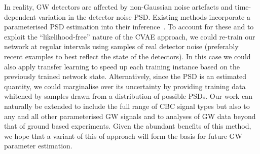 %
%
In reality, \ac{GW} detectors are affected by non-Gaussian noise artefacts and
time-dependent variation in the detector noise \ac{PSD}. Existing methods
incorporate a parameterised \ac{PSD} estimation into their
inference~\cite{2015PhRvD..91h4034L}. To account for these and to exploit the
``likelihood-free'' nature of the \ac{CVAE} approach, we could re-train our
network at regular intervals using samples of real detector noise (preferably
recent examples to best reflect the state of the detectors). In this case
we could also apply transfer learning to speed up each training instance based
on the previously trained network state.  Alternatively, since the \ac{PSD} is
an estimated quantity, we could marginalise over its uncertainty by providing
training data whitened by samples drawn from a distribution of possible
\acp{PSD}. Our work can naturally be extended to include the full range of
\ac{CBC} signal types but also to any and all other parameterised \ac{GW}
signals and to analyses of \ac{GW} data beyond that of ground based
experiments. Given the abundant benefits of this method, we hope that a variant
of this of approach will form the basis for future \ac{GW} parameter
estimation.